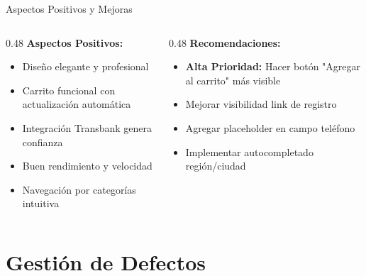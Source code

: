 \documentclass[aspectratio=169]{beamer}
\begin{document}
\begin{frame}{Aspectos Positivos y Mejoras}
\begin{columns}[T]
\begin{column}{0.48\textwidth}
\textbf{\textcolor{successgreen}{Aspectos Positivos:}}
\begin{itemize}
    \item[\textcolor{successgreen}{\faThumbsUp}] Diseño elegante y profesional
    \item[\textcolor{successgreen}{\faThumbsUp}] Carrito funcional con actualización automática
    \item[\textcolor{successgreen}{\faThumbsUp}] Integración Transbank genera confianza
    \item[\textcolor{successgreen}{\faThumbsUp}] Buen rendimiento y velocidad
    \item[\textcolor{successgreen}{\faThumbsUp}] Navegación por categorías intuitiva
\end{itemize}
\end{column}

\begin{column}{0.48\textwidth}
\textbf{\textcolor{warningorange}{Recomendaciones:}}
\begin{itemize}
    \item[\textcolor{warningorange}{\faExclamationTriangle}] \textbf{Alta Prioridad:} Hacer botón "Agregar al carrito" más visible
    \item[\textcolor{warningorange}{\faExclamationTriangle}] Mejorar visibilidad link de registro
    \item[\textcolor{warningorange}{\faWrench}] Agregar placeholder en campo teléfono
    \item[\textcolor{warningorange}{\faWrench}] Implementar autocompletado región/ciudad
\end{itemize}
\end{column}
\end{columns}
\end{frame}

\section{Gestión de Defectos}
\end{document}
